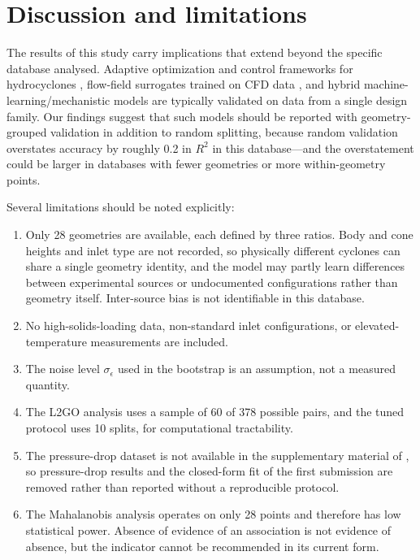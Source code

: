 \documentclass[12pt]{article}
\begin{document}
\section{Discussion and limitations}
\label{sec:related}

The results of this study carry implications that extend beyond the specific database analysed. Adaptive optimization and control frameworks for hydrocyclones \cite{rineng}, flow-field surrogates trained on CFD data \cite{mineng,e2024}, and hybrid machine-learning/mechanistic models \cite{seppur, e2025} are typically validated on data from a single design family. Our findings suggest that such models should be reported with geometry-grouped validation in addition to random splitting, because random validation overstates accuracy by roughly 0.2 in $R^2$ in this database---and the overstatement could be larger in databases with fewer geometries or more within-geometry points.

\label{sec:limits}
Several limitations should be noted explicitly:
\begin{enumerate}[label=(\roman*)]
\item Only 28 geometries are available, each defined by three ratios. Body and cone heights and inlet type are not recorded, so physically different cyclones can share a single geometry identity, and the model may partly learn differences between experimental sources or undocumented configurations rather than geometry itself. Inter-source bias is not identifiable in this database.
\item No high-solids-loading data, non-standard inlet configurations, or elevated-temperature measurements are included.
\item The noise level $\sigma_\epsilon$ used in the bootstrap is an assumption, not a measured quantity.
\item The L2GO analysis uses a sample of 60 of 378 possible pairs, and the tuned protocol uses 10 splits, for computational tractability.
\item The pressure-drop dataset is not available in the supplementary material of \cite{bregolin}, so pressure-drop results and the closed-form fit of the first submission are removed rather than reported without a reproducible protocol.
\item The Mahalanobis analysis operates on only 28 points and therefore has low statistical power. Absence of evidence of an association is not evidence of absence, but the indicator cannot be recommended in its current form.
\end{enumerate}
\end{document}

